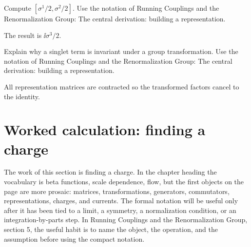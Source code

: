 \begin{exercise}
Compute \([\sigma^1/2,\sigma^2/2]\).  Use the notation of Running Couplings and the Renormalization Group: The central derivation: building a representation.
\begin{answer}
The result is \(\ii\sigma^3/2\).
\end{answer}
\end{exercise}

\begin{exercise}
Explain why a singlet term is invariant under a group transformation.  Use the notation of Running Couplings and the Renormalization Group: The central derivation: building a representation.
\begin{answer}
All representation matrices are contracted so the transformed factors cancel to the identity.
\end{answer}
\end{exercise}



\section{Worked calculation: finding a charge}













The work of this section is finding a charge.  In the chapter heading the vocabulary is beta functions, scale dependence, flow, but the first objects on the page are more prosaic: matrices, transformations, generators, commutators, representations, charges, and currents.  The formal notation will be useful only after it has been tied to a limit, a symmetry, a normalization condition, or an integration-by-parts step.  In Running Couplings and the Renormalization Group, section 5, the useful habit is to name the object, the operation, and the assumption before using the compact notation.

